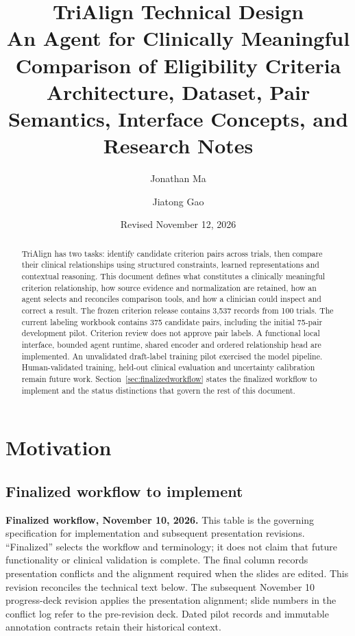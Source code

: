 \documentclass[10pt,letterpaper]{article}
\title{\textcolor{ink}{TriAlign Technical Design}\\[.4em]
  \large An Agent for Clinically Meaningful Comparison of Eligibility Criteria\\
  \normalsize Architecture, Dataset, Pair Semantics, Interface Concepts, and Research Notes}
\author{Jonathan Ma \and Jiatong Gao}
\date{Revised November 12, 2026}
\begin{document}
\maketitle
\begin{abstract}
TriAlign has two tasks: identify candidate criterion pairs across trials, then
compare their clinical relationships using structured constraints, learned
representations and contextual reasoning. This document defines what constitutes a clinically meaningful criterion relationship,
how source evidence and normalization are retained, how an agent selects and
reconciles comparison tools, and how a clinician could inspect and correct a
result. The frozen criterion release contains 3,537 records from 100 trials.
The current labeling workbook contains 375 candidate pairs, including the
initial 75-pair development pilot. Criterion review does not approve pair
labels. A functional local interface, bounded agent runtime, shared encoder
and ordered relationship head are implemented. An unvalidated draft-label
training pilot exercised the model pipeline. Human-validated training,
held-out clinical evaluation and uncertainty calibration remain future work.
Section~\ref{sec:finalizedworkflow} states the finalized workflow to implement
and the status distinctions that govern the rest of this document.
\end{abstract}

\newpage
\tableofcontents
\newpage

\section{Motivation}
\label{sec:motivation}

\subsection{Finalized workflow to implement}
\label{sec:finalizedworkflow}
\textbf{Finalized workflow, November 10, 2026.} This table is the governing
specification for implementation and subsequent presentation revisions.
``Finalized'' selects the workflow and terminology; it does not claim that
future functionality or clinical validation is complete. The final column
records presentation conflicts and the alignment required when the slides
are edited. This revision reconciles the technical text below. The subsequent November 10
progress-deck revision applies the presentation alignment; slide numbers in
the conflict log refer to the pre-revision deck. Dated pilot records and
immutable annotation contracts retain their historical context.
\end{document}
